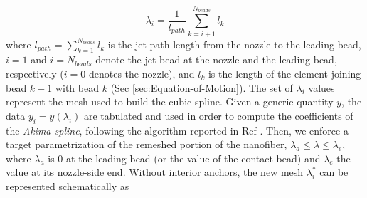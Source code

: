 \begin{equation}
\lambda_{i}=\frac{1}{l_{path}}\sum_{k=i+1}^{N_{beads}}l_{k}
\end{equation}
where $l_{path}=\sum_{k=1}^{N_{beads}}l_{k}$ is the jet path length
from the nozzle to the leading bead, $i=1$ and $i=N_{beads}$ denote
the jet bead at the nozzle and the leading bead, respectively ($i=0$ denotes
the nozzle), and $l_{k}$ is the length of the element joining bead $k-1$
with bead $k$ (Sec \ref{sec:Equation-of-Motion}). The set of ${\lambda_{i}}$ values represent the mesh
used to build the cubic spline. Given a generic quantity $y$, the
data $y_{i}=y\left(\lambda_{i}\right)$ are tabulated and used in
order to compute the coefficients of the \textit{Akima spline}, following
the algorithm reported in Ref \cite{akima1991method}. Then, we enforce
a target parametrization of the remeshed portion of the nanofiber,
$\lambda_{a}\leq\lambda\leq\lambda_{e}$, where $\lambda_{a}$ is 0 at
the leading bead (or the value of the contact bead) and $\lambda_{e}$
the value at its nozzle-side end. Without interior anchors, the new
mesh ${\lambda_{i}^{*}}$ can be represented schematically as

